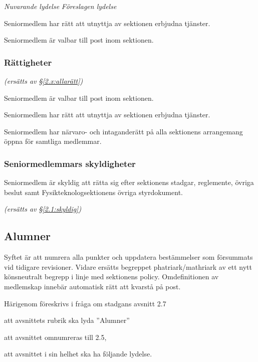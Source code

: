 \documentclass{article}
\newenvironment{lydelse}
    {\begin{paracol}{2}%
        \emph{Nuvarande lydelse}%
        \switchcolumn%
        \emph{Föreslagen lydelse}%
    \end{paracol}%
    \begin{enumerate}[label=\thesubsection.\arabic*]%
    \begin{paracol}{2}%
    }{\end{paracol}\end{enumerate}}
\newcommand{\itemb}{\item[\textbullet]}
\begin{document}
\begin{lydelse}
    \itemb Seniormedlem har rätt att utnyttja av sektionen erbjudna tjänster.
   
    \itemb Seniormedlem är valbar till post inom sektionen.
    
\switchcolumn
    \subsubsection*{Rättigheter}%
    \emph{(ersätts av \S \ref{2.x:allarätt})}
    
    \item Seniormedlem är valbar till post inom sektionen.
    
    \item Seniormedlem har rätt att utnyttja av sektionen erbjudna tjänster.
   
    \item Seniormedlem har närvaro- och intaganderätt på alla sektionens arrangemang öppna för samtliga medlemmar.

  \switchcolumn*
    \subsubsection*{Seniormedlemmars skyldigheter}%
    \itemb Seniormedlem är skyldig att rätta sig efter sektionens stadgar, regle\-mente, övriga beslut samt  Fysikteknologsektionens övriga styrdokument.
    
  \switchcolumn
    \emph{(ersätts av \S \ref{2.1:skyldig})}
\end{lydelse}

\subsection{Alumner}
Syftet är att numrera alla punkter och uppdatera bestämmelser som försummats vid tidigare revisioner.
Vidare ersätts begreppet phatriark/mathriark av ett nytt könsneutralt begrepp i linje med sektionens policy.
Omdefinitionen av medlemskap innebär automatisk rätt att kvarstå på post.

Härigenom föreskrivs i fråga om stadgans avsnitt 2.7
\begin{dels}
    \item att avsnittets rubrik ska lyda ''Alumner''
    \item att avsnittet omnumreras till 2.5,
    \item att avsnittet i sin helhet ska ha följande lydelse.
\end{dels}
\end{document}
